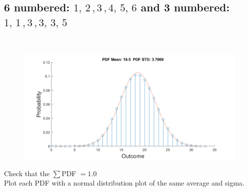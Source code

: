 \documentclass[12pt,letterpaper, onecolumn]{exam}
\begin{document}
\begin{questions}
\begin{parts}
            \part{6 numbered: $1,\,2\,,3\,,4,\,5,\,6$ and 3 numbered: $1,\,1\,,3\,,3,\,3,\,5$}\\
                \solution
                    \begin{figure}[!h]
                        \centering
                        \includegraphics[width=.91\linewidth]{Q1_d.png}
                    \end{figure}                    
        \end{parts}
        Check that the $\sum$PDF $= 1.0$\\
        Plot each PDF with a normal distribution plot of the same average and sigma.\\
        

\end{questions}
\end{document}
